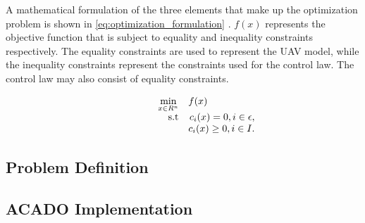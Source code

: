 A mathematical formulation of the three elements that make up the optimization problem is shown in \ref{eq:optimization_formulation} \cite{nocedalOPTIMIZATION}. $f(x)$ represents the objective function that is subject to equality and inequality constraints respectively. The equality constraints are used to represent the UAV model, while the inequality constraints represent the constraints used for the control law. The control law may also consist of equality constraints.

\begin{equation}
	\label{eq:optimization_formulation}
	\begin{array}{rrclcl}
		\displaystyle \min_{x \in R^n} & \multicolumn{3}{l}{f(x)} \\
		\textrm{s.t}
		& c_i(x) = 0, i \in \epsilon, \\
		& c_i(x) \geq 0, i \in I.
	\end{array}
\end{equation}


\subsection{Problem Definition}

\subsection{ACADO Implementation}